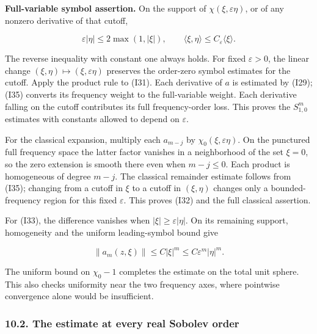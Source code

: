 \documentclass[
  11pt,
]{article}
\makeatletter
\let\ReaderOriginalAnchorStart\hyper@anchorstart
\let\ReaderOriginalAnchorEnd\hyper@anchorend
\let\ReaderPendingAliases\@empty
\def\ReaderArmAliases#1{\gdef\ReaderPendingAliases{#1}}
\def\hyper@anchorstart#1{\ReaderIfNativeAnchorTF{#1}{\ReaderPendingAliases\global\let\ReaderPendingAliases\@empty}{}\ReaderOriginalAnchorStart{#1}}
\makeatother
\begin{document}
\textbf{Full-variable symbol assertion.} On the support of
\(\chi(\xi,\varepsilon\eta)\), or of any nonzero derivative of that
cutoff,

\[
 \varepsilon|\eta|\leq2\max(1,|\xi|),\qquad
 \langle\xi,\eta\rangle\leq C_\varepsilon\langle\xi\rangle.
 \tag{I35}
\]

The reverse inequality with constant one always holds. For fixed
\(\varepsilon>0\), the linear change
\((\xi,\eta)\mapsto(\xi,\varepsilon\eta)\) preserves the order-zero
symbol estimates for the cutoff. Apply the product rule to (I31). Each
derivative of \(a\) is estimated by (I29); (I35) converts its frequency
weight to the full-variable weight. Each derivative falling on the
cutoff contributes its full frequency-order loss. This proves the
\(S^m_{1,0}\) estimates with constants allowed to depend on
\(\varepsilon\).

For the classical expansion, multiply each \(a_{m-j}\) by
\(\chi_0(\xi,\varepsilon\eta)\). On the punctured full frequency space
the latter factor vanishes in a neighborhood of the set \(\xi=0\), so
the zero extension is smooth there even when \(m-j\leq0\). Each product
is homogeneous of degree \(m-j\). The classical remainder estimate
follows from (I35); changing from a cutoff in \(\xi\) to a cutoff in
\((\xi,\eta)\) changes only a bounded-frequency region for this fixed
\(\varepsilon\). This proves (I32) and the full classical assertion.

For (I33), the difference vanishes when \(|\xi|\geq\varepsilon|\eta|\).
On its remaining support, homogeneity and the uniform leading-symbol
bound give

\[
 \|a_m(z,\xi)\|\leq C|\xi|^m
      \leq C\varepsilon^m|\eta|^m.
\]

The uniform bound on \(\chi_0-1\) completes the estimate on the total
unit sphere. This also checks uniformity near the two frequency axes,
where pointwise convergence alone would be insufficient.

\ReaderArmAliases{\ReaderOriginalAnchorStart{pp-b-the-operator-estimate-at-every-real-order}\ReaderOriginalAnchorEnd\begingroup\expandafter\def\csname @currentHref\endcsname{pp-b-the-operator-estimate-at-every-real-order}\label{pp-b-the-operator-estimate-at-every-real-order}\endgroup\ReaderOriginalAnchorStart{10-2-the-estimate-at-every-real-sobolev-order}\ReaderOriginalAnchorEnd\begingroup\expandafter\def\csname @currentHref\endcsname{10-2-the-estimate-at-every-real-sobolev-order}\label{10-2-the-estimate-at-every-real-sobolev-order}\endgroup}
\subsubsection{10.2. The estimate at every real Sobolev
order}\label{the-estimate-at-every-real-sobolev-order}
\end{document}
